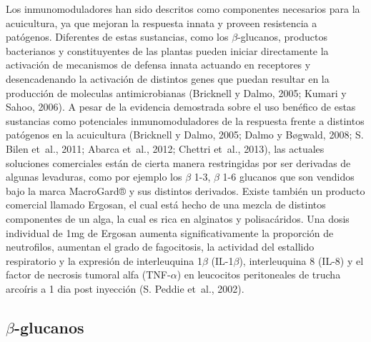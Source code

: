 \documentclass[12pt,letterpaper,oneside]{scrbook}
\begin{document}
Los inmunomoduladores han sido descritos como componentes necesarios
para la acuicultura, ya que mejoran la respuesta innata y proveen
resistencia a patógenos. Diferentes de estas sustancias, como los
\(\beta\)-glucanos, productos bacterianos y constituyentes de las
plantas pueden iniciar directamente la activación de mecanismos de
defensa innata actuando en receptores y desencadenando la activación de
distintos genes que puedan resultar en la producción de moleculas
antimicrobianas (Bricknell y Dalmo, 2005; Kumari y Sahoo, 2006). A pesar
de la evidencia demostrada sobre el uso benéfico de estas sustancias
como potenciales inmunomoduladores de la respuesta frente a distintos
patógenos en la acuicultura (Bricknell y Dalmo, 2005; Dalmo y Bøgwald,
2008; S. Bilen et~al., 2011; Abarca et~al., 2012; Chettri et~al., 2013),
las actuales soluciones comerciales están de cierta manera restringidas
por ser derivadas de algunas levaduras, como por ejemplo los \(\beta\)
1-3, \(\beta\) 1-6 glucanos que son vendidos bajo la marca MacroGard® y
sus distintos derivados. Existe también un producto comercial llamado
Ergosan, el cual está hecho de una mezcla de distintos componentes de un
alga, la cual es rica en alginatos y polisacáridos. Una dosis individual
de 1mg de Ergosan aumenta significativamente la proporción de
neutrofilos, aumentan el grado de fagocitosis, la actividad del
estallido respiratorio y la expresión de interleuquina 1\(\beta\)
(IL-1\(\beta\)), interleuquina 8 (IL-8) y el factor de necrosis tumoral
alfa (TNF-\(\alpha\)) en leucocitos peritoneales de trucha arcoíris a 1
dia post inyección (S. Peddie et~al., 2002).

\subsection{$\beta$-glucanos}
\end{document}
